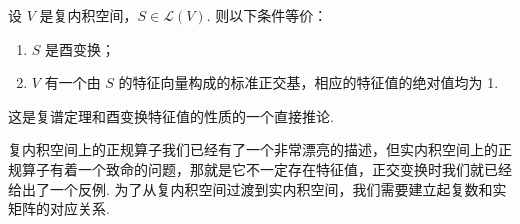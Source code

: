 \begin{theorem}{}{}
    设 $ V $ 是复内积空间，$ S \in \mathcal{L}(V) $. 则以下条件等价：
    \begin{enumerate}
        \item $ S $ 是酉变换；

        \item $ V $ 有一个由 $ S $ 的特征向量构成的标准正交基，相应的特征值的绝对值均为 1.
    \end{enumerate}
\end{theorem}

这是复谱定理和酉变换特征值的性质的一个直接推论.

复内积空间上的正规算子我们已经有了一个非常漂亮的描述，但实内积空间上的正规算子有着一个致命的问题，那就是它不一定存在特征值，正交变换时我们就已经给出了一个反例. 为了从复内积空间过渡到实内积空间，我们需要建立起复数和实矩阵的对应关系.





